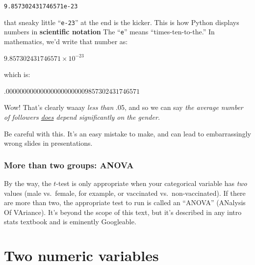 \vspace{-.1in}
\begin{center}
\texttt{9.857302431746571e-23}
\end{center}
\vspace{-.1in}


that sneaky little ``\texttt{e-23}'' at the end is the kicker. This is how
Python displays numbers in \textbf{scientific notation} The
``\texttt{e}'' means ``times-ten-to-the.'' In mathematics, we'd write that
number as:

\vspace{-.2in}
\begin{center}
$9.857302431746571 \times 10^{-23}$
\end{center}
\vspace{-.2in}

which is:

\vspace{-.2in}
\begin{center}
$.000000000000000000000009857302431746571$
\end{center}
\vspace{-.2in}

Wow! That's clearly waaay \textit{less than} .05, and so we can say \textit{the
average number of followers \underline{does} depend significantly on the gender.}

Be careful with this. It's an easy mistake to make, and can lead to
embarrassingly wrong slides in presentations. \smiley

\subsubsection{More than two groups: ANOVA}


By the way, the $t$-test is only appropriate when your categorical variable has
\textit{two} values (male vs.~female, for example, or vaccinated
vs.~non-vaccinated). If there are more than two, the appropriate test to run is
called an ``ANOVA'' (ANalysis Of VAriance). It's beyond the scope of this text,
but it's described in any intro stats textbook and is eminently Googleable.

\section{Two numeric variables}


